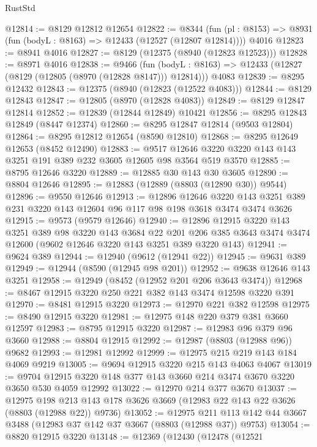 \begin{lexlean}{RustStd}
\begin{coremodule}
@12814 := @8129 @12812 @12654
@12822 := @8344
    (fun (pl : @8153) => @8931 (fun (bodyL : @8163) => @12433 (@12527 (@12807 @12814))))
    @4016
@12823 := @8941 @4016
@12827 := @8129 (@12375 (@8940 (@12823 @12523)))
@12828 := @8971 @4016
@12838 := @9466
    (fun (bodyL : @8163) => @12433 (@12827 (@8129 (@12805 (@8970 (@12828 @8147))) @12814)))
    @4083
@12839 := @8295 @12432
@12843 := @12375 (@8940 (@12823 (@12522 @4083)))
@12844 := @8129 @12843
@12847 := @12805 (@8970 (@12828 @4083))
@12849 := @8129 @12847 @12814
@12852 := @12839 (@12844 @12849) @10421
@12856 := @8295 @12843 @12849 (@8447 @12374)
@12860 := @8295 @12847 @12814 (@9503 @12804)
@12864 := @8295 @12812 @12654 (@8590 @12810)
@12868 := @8295 @12649 @12653 (@8452 @12490)
@12883 := @9517 @12646 @3220 @3220 @143 @143 @3251 @191 @389 @232 @3605 @12605 @98 @3564 @519 @3570
@12885 := @8795 @12646 @3220
@12889 := @12885 @30 @143 @30 @3605
@12890 := @8804 @12646
@12895 := @12883 (@12889 (@8803 (@12890 @30)) @9544)
@12896 := @9550 @12646
@12913 := @12896
    @12646
    @3220
    @143
    @3251
    @389
    @231
    @3220
    @143
    @12604
    @96
    @117
    @98
    @198
    @3618
    @3474
    @3474
    @3626
@12915 := @9573 (@9579 @12646)
@12940 := @12896
    @12915
    @3220
    @143
    @3251
    @389
    @98
    @3220
    @143
    @3684
    @22
    @201
    @206
    @385
    @3643
    @3474
    @3474
    @12600
    (@9602 @12646 @3220 @143 @3251 @389 @3220 @143)
@12941 := @9624 @389
@12944 := @12940 (@9612 (@12941 @22))
@12945 := @9631 @389
@12949 := @12944 (@8590 (@12945 @98 @201))
@12952 := @9638 @12646 @143 @3251
@12958 := @12949 (@8452 (@12952 @201 @206 @3643 @3474))
@12968 := @8467 @12915 @3220 @250 @221 @382 @143 @3474 @12598 @3220 @391
@12970 := @8481 @12915 @3220
@12973 := @12970 @221 @382 @12598
@12975 := @8490 @12915 @3220
@12981 := @12975 @148 @220 @379 @381 @3660 @12597
@12983 := @8795 @12915 @3220
@12987 := @12983 @96 @379 @96 @3660
@12988 := @8804 @12915
@12992 := @12987 (@8803 (@12988 @96)) @9682
@12993 := @12981 @12992
@12999 := @12975 @215 @219 @143 @184 @4069 @9219
@13005 := @9694 @12915 @3220 @215 @143 @4063 @4067
@13019 := @9704 @12915 @3220 @148 @377 @143 @3660 @214 @3474 @3670 @3220 @3650 @530 @4059 @12992
@13022 := @12970 @214 @377 @3670
@13037 := @12975
    @198
    @213
    @143
    @178
    @3626
    @3669
    (@12983 @22 @143 @22 @3626 (@8803 (@12988 @22)) @9736)
@13052 := @12975
    @211
    @113
    @142
    @44
    @3667
    @3488
    (@12983 @37 @142 @37 @3667 (@8803 (@12988 @37)) @9753)
@13054 := @8820 @12915 @3220
@13148 := @12369
    (@12430
      (@12478
        (@12521

\end{coremodule}
\end{lexlean}
